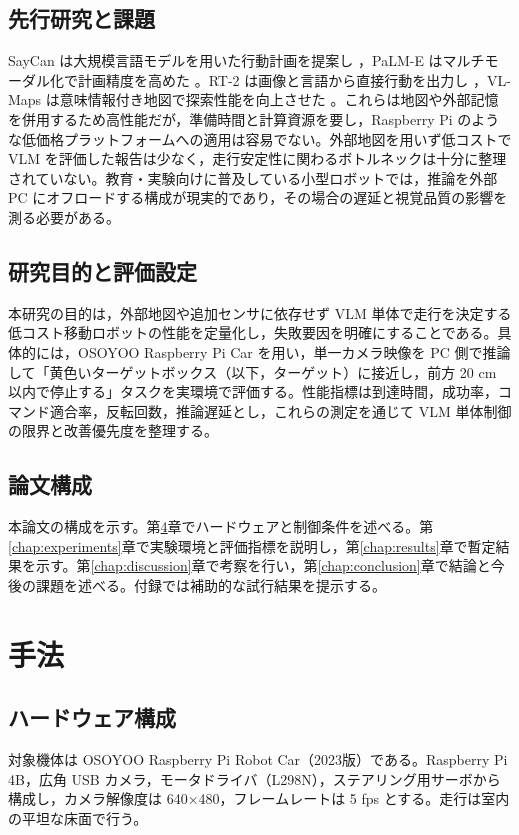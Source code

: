 \documentclass[a4paper,11pt]{ltjsreport}
\begin{document}
\section{先行研究と課題}
SayCan は大規模言語モデルを用いた行動計画を提案し \cite{saycan}，PaLM-E はマルチモーダル化で計画精度を高めた \cite{palme}。RT-2 は画像と言語から直接行動を出力し \cite{rt2}，VL-Maps は意味情報付き地図で探索性能を向上させた \cite{vlmaps}。これらは地図や外部記憶を併用するため高性能だが，準備時間と計算資源を要し，Raspberry Pi のような低価格プラットフォームへの適用は容易でない。外部地図を用いず低コストで VLM を評価した報告は少なく，走行安定性に関わるボトルネックは十分に整理されていない。教育・実験向けに普及している小型ロボットでは，推論を外部 PC にオフロードする構成が現実的であり，その場合の遅延と視覚品質の影響を測る必要がある。

\section{研究目的と評価設定}
本研究の目的は，外部地図や追加センサに依存せず VLM 単体で走行を決定する低コスト移動ロボットの性能を定量化し，失敗要因を明確にすることである。具体的には，OSOYOO Raspberry Pi Car を用い，単一カメラ映像を PC 側で推論して「黄色いターゲットボックス（以下，ターゲット）に接近し，前方 20 cm 以内で停止する」タスクを実環境で評価する。性能指標は到達時間，成功率，コマンド適合率，反転回数，推論遅延とし，これらの測定を通じて VLM 単体制御の限界と改善優先度を整理する。

\section{論文構成}
本論文の構成を示す。第\ref{chap:method}章でハードウェアと制御条件を述べる。第\ref{chap:experiments}章で実験環境と評価指標を説明し，第\ref{chap:results}章で暫定結果を示す。第\ref{chap:discussion}章で考察を行い，第\ref{chap:conclusion}章で結論と今後の課題を述べる。付録では補助的な試行結果を提示する。

\chapter{手法}
\label{chap:method}

\section{ハードウェア構成}
対象機体は OSOYOO Raspberry Pi Robot Car（2023版）である。Raspberry Pi 4B，広角 USB カメラ，モータドライバ（L298N），ステアリング用サーボから構成し，カメラ解像度は 640×480，フレームレートは 5 fps とする。走行は室内の平坦な床面で行う。
\end{document}
